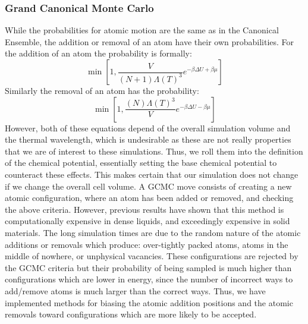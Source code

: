 \subsubsection{Grand Canonical Monte Carlo}
While the probabilities for atomic motion are the same as in the Canonical Ensemble, the addition or removal of an atom have their own probabilities. For the addition of an atom the probability is formally:
\begin{equation}
  \min[1, \frac{V}{(N+1) \Lambda(T)^{3}}e^{-\beta\Delta U + \beta \mu}]
\end{equation}
Similarly the removal of an atom has the probability:
\begin{equation}
  \min[1, \frac{(N)\Lambda(T)^{3}}{V}e^{-\beta\Delta U - \beta \mu}]
\end{equation}
However, both of these equations depend of the overall simulation volume and the thermal wavelength, which is undesirable as these are not really properties that we are of interest to these simulations.
Thus, we roll them into the definition of the chemical potential, essentially setting the base chemical potential to counteract these effects.
This makes certain that our simulation does not change if we change the overall cell volume.
A GCMC move consists of creating a new atomic configuration, where an atom has been added or removed, and checking the above criteria.
However, previous results have shown that this method is computationally expensive in dense liquids, and exceedingly expensive in solid materials.
The long simulation times are due to the random nature of the atomic additions or removals which produce: over-tightly packed atoms, atoms in the middle of nowhere, or unphysical vacancies.
These configurations are rejected by the GCMC criteria but their probability of being sampled is much higher than configurations which are lower in energy, since the number of incorrect ways to add/remove atoms is much larger than the correct ways.
Thus, we have implemented methods for biasing the atomic addition positions and the atomic removals toward configurations which are more likely to be accepted.

